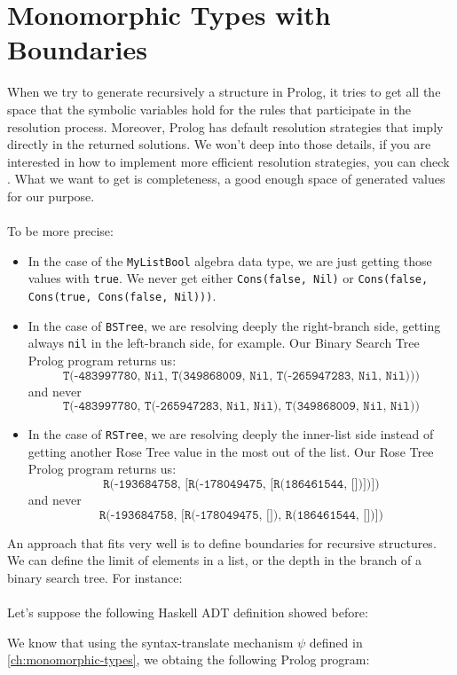 \documentclass{report}
\theoremstyle{definition}
\theoremstyle{definition}
\newcommand{\ttt}[1]{\texttt{#1}}
\begin{document}
\section{Monomorphic Types with Boundaries} \label{ch:monomorphic-types-boundaries}

When we try to generate recursively a structure in Prolog, it tries to get all the space that the symbolic variables hold for the rules that participate in the resolution process. Moreover, Prolog has default resolution strategies that imply directly in the returned solutions. We won't deep into those details, if you are interested in how to implement more efficient resolution strategies, you can check \cite{effgenttransf}. What we want to get is completeness, a good enough space of generated values for our purpose.\\\\
To be more precise:
\begin{itemize}
	\item In the case of the \ttt{MyListBool} algebra data type, we are just getting those values with \ttt{true}. We never get either \ttt{Cons(false, Nil)} or \ttt{Cons(false, Cons(true, Cons(false, Nil)))}.
	\item In the case of \ttt{BSTree}, we are resolving deeply the right-branch side, getting always \ttt{nil} in the left-branch side, for example. Our Binary Search Tree Prolog program returns us: $$\ttt{T(-483997780, Nil, T(349868009, Nil, T(-265947283, Nil, Nil)))}$$ and never $$\ttt{T(-483997780, T(-265947283, Nil, Nil), T(349868009, Nil, Nil))}$$
	\item In the case of \ttt{RSTree}, we are resolving deeply the inner-list side instead of getting another Rose Tree value in the most out of the list. Our Rose Tree Prolog program returns us: $$\ttt{R(-193684758, [R(-178049475, [R(186461544, [])])])}$$ and never $$\ttt{R(-193684758, [R(-178049475, []), R(186461544, [])])}$$
\end{itemize}
An approach that fits very well is to define boundaries for recursive structures. We can define the limit of elements in a list, or the depth in the branch of a binary search tree. For instance:\\\\
Let's suppose the following Haskell ADT definition showed before:

We know that using the syntax-translate mechanism $\psi$ defined in \ref{ch:monomorphic-types}, we obtaing the following Prolog program:
\end{document}
